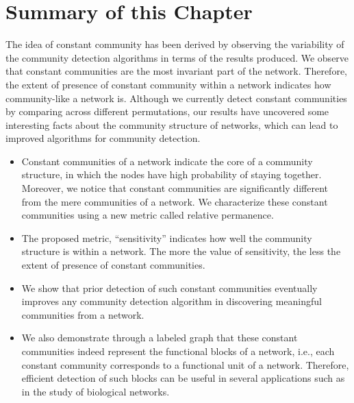 \section{Summary of this Chapter}
The idea of constant community has been derived by observing the variability of the community detection algorithms in terms of the
results produced. We observe that constant communities are the most invariant part of the network. Therefore, the extent of presence of
constant community
within a network indicates how community-like a network is. Although we currently
detect constant communities by comparing across different permutations, our results have uncovered
some interesting facts about the community structure of networks, which can lead to improved algorithms for community detection.

\begin{itemize}
 \item Constant communities of a network indicate the core of a community structure, in which the nodes have high probability of staying
together. Moreover, we notice that constant communities are significantly different from the mere communities of a network. We
characterize these
constant communities using a new metric called relative permanence.

\item  The proposed metric, ``sensitivity'' indicates how well the community structure is within a network. The more the value of
sensitivity, the less the extent of presence of constant communities.

\item We show that prior detection of such constant communities eventually  improves any community detection algorithm in discovering
meaningful communities from a network.

\item We also demonstrate through a labeled graph that these constant communities indeed represent the functional blocks of a network,
i.e., each constant community corresponds to a functional unit of a network.  Therefore, efficient detection of such blocks can be useful
in several applications such as in the study of biological networks.
\end{itemize}




% 
